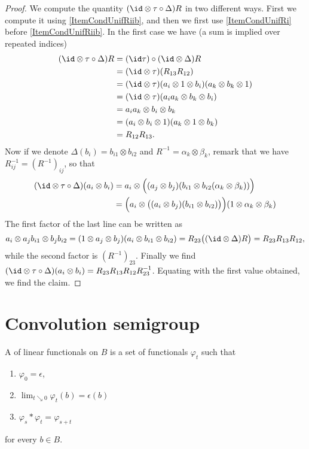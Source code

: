 \begin{proof}
We compute the quantity $(\id\otimes\tau\circ\Delta)R$ in two different ways. First we compute it using \ref{ItemCondUnifRiib}, and then we first use \ref{ItemCondUnifRi} before \ref{ItemCondUnifRiib}. In the first case we have (a sum is implied over repeated indices)
\begin{align*}
  (\id\otimes\tau\circ\Delta)R&=(\id\tau)\circ(\id\otimes\Delta)R\\
		&=(\id\otimes\tau)(R_{13}R_{12})\\
		&=(\id\otimes\tau)(a_i\otimes 1\otimes b_i)(a_k\otimes b_k\otimes 1)\\
		&=(\id\otimes\tau)(a_ia_k\otimes b_k\otimes b_i)\\
		&=a_ia_k\otimes b_i\otimes b_k\\
		&=(a_i\otimes b_i\otimes 1)(a_k\otimes 1\otimes b_k)\\
		&=R_{12}R_{13}.
\end{align*}
Now if we denote $\Delta(b_i)=b_{i1}\otimes b_{i2}$ and $R^{-1}=\alpha_k\otimes\beta_k$, remark that we have $R_{ij}^{-1}=(R^{-1})_{ij}$, so that
\begin{align*}
(\id\otimes\tau\circ\Delta)(a_i\otimes b_i)&=a_i\otimes\Big( (a_j\otimes b_j)(b_{i1}\otimes b_{i2}(\alpha_k\otimes\beta_k))   \Big)\\
		&=\Big( a_i\otimes\big( (a_i\otimes b_j)(b_{i1}\otimes b_{i2}) \big) \Big)(1\otimes\alpha_k\otimes\beta_k)
\end{align*}
The first factor of the last line can be written as
\[ 
  a_i\otimes a_jb_{i1}\otimes b_jb_{i2}=(1\otimes a_j\otimes b_j)(a_i\otimes b_{i1}\otimes b_{i2})=R_{23}\big( (\id\otimes\Delta)R \big)=R_{23}R_{13}R_{12},
\]
while the second factor is $(R^{-1})_{23}$. Finally we find $(\id\otimes\tau\circ\Delta)(a_i\otimes b_i)=R_{23}R_{13}R_{12}R_{23}^{-1}$. Equating with the first value obtained, we find the claim.
\end{proof}



\section{Convolution semigroup}

\begin{definition}
	A  of linear functionals on $B$ is a set of functionals $\varphi_t$ such that
	\begin{enumerate}
		\item
			$\varphi_0=\epsilon$,
		\item
			$\lim_{t\searrow 0}\varphi_t(b)=\epsilon(b) $
		\item
			$\varphi_s*\varphi_t=\varphi_{s+t}$
	\end{enumerate}
	for every $b\in B$.
\end{definition}

